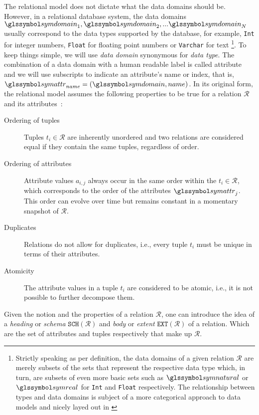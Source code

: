 The relational model does not dictate what the data domains should be. However, in a relational database system, the data domains $\symdomain_1, \symdomain_2, ... \symdomain_N$ usually correspond to the data types supported by the database, for example, \lstinline{Int} for integer numbers, \lstinline{Float} for floating point numbers or \lstinline{Varchar} for text \footnote{Strictly speaking as per definition, the data domains of a given relation $\mathcal{R}$ are merely subsets of the sets that represent the respective data type which, in turn, are subsets of even more basic sets such as $\symnatural$ or $\symreal$ for \lstinline{Int} and \lstinline{Float} respectively. The relationship between types and data domains is subject of a more categorical approach to data models and nicely layed out in \cite{Spivak:2009Simplicial}}. To keep things simple, we will use \emph{data domain} synonymous for \emph{data type}. The combination of a data domain with a human readable label is called attribute and we will use subscripts to indicate an attribute's name or index, that is, $\symattr_{name} = (\symdomain, name)$. In its original form, the relational model assumes the following properties to be true for a relation $\mathcal{R}$ and its attributes~\cite{Codd:1970Relational}:

\begin{description}
    \item[Ordering of tuples] Tuples $t_i \in \mathcal{R}$ are inherently unordered and two relations are considered equal if they contain the same tuples, regardless of order.
    \item[Ordering of attributes] Attribute values $a_{i,j}$ always occur in the same order within the $t_i \in \mathcal{R}$, which corresponds to the order of the attributes $\symattr_j$. This order can evolve over time but remains constant in a momentary snapshot of $\mathcal{R}$.
    \item[Duplicates] Relations do not allow for duplicates, i.e., every tuple $t_i$ must be unique in terms of their attributes.
    \item[Atomicity] The attribute values in a tuple $t_i$ are considered to be atomic, i.e., it is not possible to further decompose them.
\end{description}

Given the notion and the properties of a relation $\mathcal{R}$, one can introduce the idea of a \emph{heading} or \emph{schema} $\mathtt{SCH}(\mathcal{R})$ and \emph{body} or \emph{extent} $\mathtt{EXT}(\mathcal{R})$ of a relation. Which are the set of attributes and tuples respectively that make up $\mathcal{R}$.

